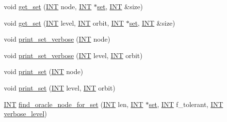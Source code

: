 \begin{DoxyCompactItemize}
\item 
void \mbox{\hyperlink{classgenerator_ad17922da9bcefd923c0b85b70bd7af67}{get\+\_\+set}} (\mbox{\hyperlink{galois_8h_a09fddde158a3a20bd2dcadb609de11dc}{I\+NT}} node, \mbox{\hyperlink{galois_8h_a09fddde158a3a20bd2dcadb609de11dc}{I\+NT}} $\ast$\mbox{\hyperlink{nauty_8h_a9690bea211101f22a5e154087590c3da}{set}}, \mbox{\hyperlink{galois_8h_a09fddde158a3a20bd2dcadb609de11dc}{I\+NT}} \&size)
\item 
void \mbox{\hyperlink{classgenerator_a7b216a1bee2ff4873ba7ed40f85be0af}{get\+\_\+set}} (\mbox{\hyperlink{galois_8h_a09fddde158a3a20bd2dcadb609de11dc}{I\+NT}} level, \mbox{\hyperlink{galois_8h_a09fddde158a3a20bd2dcadb609de11dc}{I\+NT}} orbit, \mbox{\hyperlink{galois_8h_a09fddde158a3a20bd2dcadb609de11dc}{I\+NT}} $\ast$\mbox{\hyperlink{nauty_8h_a9690bea211101f22a5e154087590c3da}{set}}, \mbox{\hyperlink{galois_8h_a09fddde158a3a20bd2dcadb609de11dc}{I\+NT}} \&size)
\item 
void \mbox{\hyperlink{classgenerator_a223818691e87880f6874244e3c129f34}{print\+\_\+set\+\_\+verbose}} (\mbox{\hyperlink{galois_8h_a09fddde158a3a20bd2dcadb609de11dc}{I\+NT}} node)
\item 
void \mbox{\hyperlink{classgenerator_a8b169a6d998735a44526cdd927f8b9f8}{print\+\_\+set\+\_\+verbose}} (\mbox{\hyperlink{galois_8h_a09fddde158a3a20bd2dcadb609de11dc}{I\+NT}} level, \mbox{\hyperlink{galois_8h_a09fddde158a3a20bd2dcadb609de11dc}{I\+NT}} orbit)
\item 
void \mbox{\hyperlink{classgenerator_a6834dd21ab187064c4fb6b8653093605}{print\+\_\+set}} (\mbox{\hyperlink{galois_8h_a09fddde158a3a20bd2dcadb609de11dc}{I\+NT}} node)
\item 
void \mbox{\hyperlink{classgenerator_a84b677d1943b20361ef496ae88590bc3}{print\+\_\+set}} (\mbox{\hyperlink{galois_8h_a09fddde158a3a20bd2dcadb609de11dc}{I\+NT}} level, \mbox{\hyperlink{galois_8h_a09fddde158a3a20bd2dcadb609de11dc}{I\+NT}} orbit)
\item 
\mbox{\hyperlink{galois_8h_a09fddde158a3a20bd2dcadb609de11dc}{I\+NT}} \mbox{\hyperlink{classgenerator_acdf58f4d0bdb6a88af63cdd5fb5d6bff}{find\+\_\+oracle\+\_\+node\+\_\+for\+\_\+set}} (\mbox{\hyperlink{galois_8h_a09fddde158a3a20bd2dcadb609de11dc}{I\+NT}} len, \mbox{\hyperlink{galois_8h_a09fddde158a3a20bd2dcadb609de11dc}{I\+NT}} $\ast$\mbox{\hyperlink{nauty_8h_a9690bea211101f22a5e154087590c3da}{set}}, \mbox{\hyperlink{galois_8h_a09fddde158a3a20bd2dcadb609de11dc}{I\+NT}} f\+\_\+tolerant, \mbox{\hyperlink{galois_8h_a09fddde158a3a20bd2dcadb609de11dc}{I\+NT}} \mbox{\hyperlink{classgenerator_a7fedc6488314cbc00dbfcc42d311e1ce}{verbose\+\_\+level}})

\end{DoxyCompactItemize}
